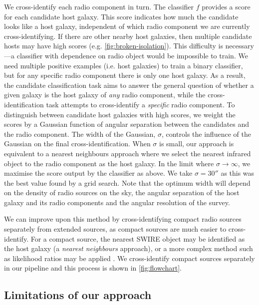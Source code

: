     {We cross-identify each radio component in turn. The classifier $f$
    provides a score for each candidate host galaxy. This score indicates how
    much the candidate looks like a host galaxy, independent of which radio
    component we are currently cross-identifying. If there are other nearby host
    galaxies, then multiple candidate hosts may have high scores (e.g.
    \autoref{fig:broken-isolation}). This difficulty is necessary---a classifier
    with dependence on radio object would be impossible to train. We
    need multiple positive examples (i.e. host galaxies) to train a binary classifier, but
    for any specific radio component there is only one host galaxy. As a
    result, the candidate classification task aims to answer the general question
    of whether a given galaxy is the host galaxy of \emph{any} radio
    component, while the cross-identification task attempts to cross-identify
    a \emph{specific} radio component. To distinguish between candidate host
    galaxies with high scores, we weight the scores by a Gaussian function of
    angular separation between the candidates and the radio component.} The
    width of the Gaussian, $\sigma$, controls the influence of the Gaussian on
    the final cross-identification. When $\sigma$ is small, our approach is
    equivalent to a nearest neighbours approach where we select the nearest
    infrared object to the radio component as the host galaxy. In the limit
    where $\sigma \to \infty$, we maximise the score output by the
    classifier as above. We take $\sigma = 30''$ as this was the best value
    found by a grid search. {Note that the optimum width will depend on
    the density of radio sources on the sky, the angular separation of the
    host galaxy and its radio components and the angular resolution of the survey.}

    {We can improve upon this method by cross-identifying compact radio sources
    separately from extended sources, as compact sources are much easier to
    cross-identify. For a compact source, the nearest SWIRE object may be
    identified as the host galaxy (a \emph{nearest neighbours} approach), or a
    more complex method such as likelihood ratios may be applied
    \citep[see][]{weston18lrpy}. We cross-identify compact sources separately
    in our pipeline and this process is shown in \autoref{fig:flowchart}.}

  \subsection{Limitations of our approach}
    \label{sec:atlas-xid-limitations}

